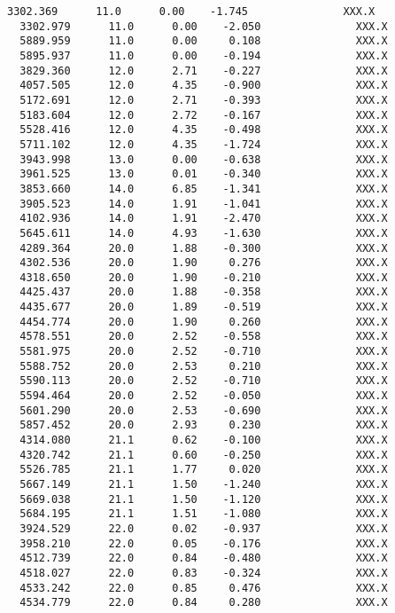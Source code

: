 \documentclass[11pt]{article}
\begin{document}
    \begin{Verbatim}[commandchars=\\\{\}]
  3302.369      11.0      0.00    -1.745               XXX.X
  3302.979      11.0      0.00    -2.050               XXX.X
  5889.959      11.0      0.00     0.108               XXX.X  
  5895.937      11.0      0.00    -0.194               XXX.X
  3829.360      12.0      2.71    -0.227               XXX.X
  4057.505      12.0      4.35    -0.900               XXX.X
  5172.691      12.0      2.71    -0.393               XXX.X
  5183.604      12.0      2.72    -0.167               XXX.X
  5528.416      12.0      4.35    -0.498               XXX.X
  5711.102      12.0      4.35    -1.724               XXX.X
  3943.998      13.0      0.00    -0.638               XXX.X
  3961.525      13.0      0.01    -0.340               XXX.X
  3853.660      14.0      6.85    -1.341               XXX.X
  3905.523      14.0      1.91    -1.041               XXX.X
  4102.936      14.0      1.91    -2.470               XXX.X
  5645.611      14.0      4.93    -1.630               XXX.X
  4289.364      20.0      1.88    -0.300               XXX.X
  4302.536      20.0      1.90     0.276               XXX.X
  4318.650      20.0      1.90    -0.210               XXX.X
  4425.437      20.0      1.88    -0.358               XXX.X
  4435.677      20.0      1.89    -0.519               XXX.X
  4454.774      20.0      1.90     0.260               XXX.X
  4578.551      20.0      2.52    -0.558               XXX.X
  5581.975      20.0      2.52    -0.710               XXX.X
  5588.752      20.0      2.53     0.210               XXX.X
  5590.113      20.0      2.52    -0.710               XXX.X
  5594.464      20.0      2.52    -0.050               XXX.X
  5601.290      20.0      2.53    -0.690               XXX.X
  5857.452      20.0      2.93     0.230               XXX.X
  4314.080      21.1      0.62    -0.100               XXX.X
  4320.742      21.1      0.60    -0.250               XXX.X
  5526.785      21.1      1.77     0.020               XXX.X
  5667.149      21.1      1.50    -1.240               XXX.X
  5669.038      21.1      1.50    -1.120               XXX.X
  5684.195      21.1      1.51    -1.080               XXX.X
  3924.529      22.0      0.02    -0.937               XXX.X
  3958.210      22.0      0.05    -0.176               XXX.X
  4512.739      22.0      0.84    -0.480               XXX.X
  4518.027      22.0      0.83    -0.324               XXX.X
  4533.242      22.0      0.85     0.476               XXX.X
  4534.779      22.0      0.84     0.280               XXX.X

\end{Verbatim}
\end{document}
